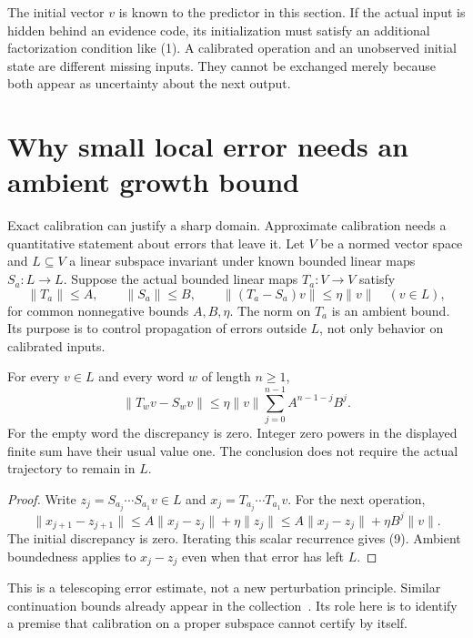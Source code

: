 The initial vector $v$ is known to the predictor in this section. If the actual input is hidden behind an evidence code, its initialization must satisfy an additional factorization condition like (1). A calibrated operation and an unobserved initial state are different missing inputs. They cannot be exchanged merely because both appear as uncertainty about the next output.

\section{Why small local error needs an ambient growth bound}\label{GA:sec:approx}
Exact calibration can justify a sharp domain. Approximate calibration needs a quantitative statement about errors that leave it. Let $V$ be a normed vector space and $L\subseteq V$ a linear subspace invariant under known bounded linear maps $S_a:L\to L$. Suppose the actual bounded linear maps $T_a:V\to V$ satisfy
\[
\|T_a\|\le A,\qquad \|S_a\|\le B,\qquad
\|(T_a-S_a)v\|\le\eta\|v\|\quad(v\in L),\tag{8}
\]
for common nonnegative bounds $A,B,\eta$. The norm on $T_a$ is an ambient bound. Its purpose is to control propagation of errors outside $L$, not only behavior on calibrated inputs.

\begin{GAproposition}\label{GA:prop:approx}
For every $v\in L$ and every word $w$ of length $n\ge1$,
\[
\|T_wv-S_wv\|
\le\eta\|v\|\sum_{j=0}^{n-1}A^{n-1-j}B^j.\tag{9}
\]
For the empty word the discrepancy is zero. Integer zero powers in the displayed finite sum have their usual value one. The conclusion does not require the actual trajectory to remain in $L$.
\end{GAproposition}
\begin{proof}
Write $z_j=S_{a_j}\cdots S_{a_1}v\in L$ and $x_j=T_{a_j}\cdots T_{a_1}v$. For the next operation,
\[
\|x_{j+1}-z_{j+1}\|
\le A\|x_j-z_j\|+\eta\|z_j\|
\le A\|x_j-z_j\|+\eta B^j\|v\|.
\]
The initial discrepancy is zero. Iterating this scalar recurrence gives (9). Ambient boundedness applies to $x_j-z_j$ even when that error has left $L$.
\end{proof}

This is a telescoping error estimate, not a new perturbation principle. Similar continuation bounds already appear in the collection~\cite{GA:understanding,GA:resolution}. Its role here is to identify a premise that calibration on a proper subspace cannot certify by itself.

